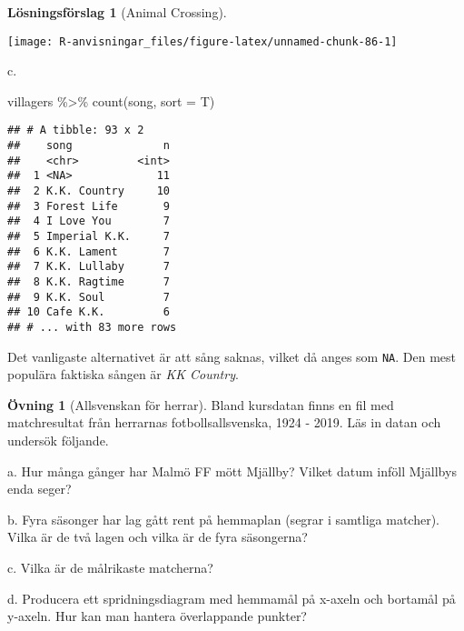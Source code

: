\documentclass[
]{book}
\newenvironment{Shaded}{\begin{snugshade}}{\end{snugshade}}
\newcommand{\AttributeTok}[1]{\textcolor[rgb]{0.77,0.63,0.00}{#1}}
\newcommand{\FunctionTok}[1]{\textcolor[rgb]{0.00,0.00,0.00}{#1}}
\newcommand{\NormalTok}[1]{#1}
\newcommand{\SpecialCharTok}[1]{\textcolor[rgb]{0.00,0.00,0.00}{#1}}
\theoremstyle{definition}
\theoremstyle{definition}
\theoremstyle{definition}
\newtheorem{exercise}{Övning}[chapter]
\theoremstyle{definition}
\newtheorem{hypothesis}{Lösningsförslag}[chapter]
\theoremstyle{remark}
\begin{document}
\begin{hypothesis}[Animal Crossing]
\begin{center}\texttt{[image: R-anvisningar\_files/figure-latex/unnamed-chunk-86-1]} \end{center}

c.

\begin{Shaded}
\begin{Highlighting}[]
\NormalTok{villagers }\SpecialCharTok{\%\textgreater{}\%} 
  \FunctionTok{count}\NormalTok{(song, }\AttributeTok{sort =}\NormalTok{ T)}
\end{Highlighting}
\end{Shaded}

\begin{verbatim}
## # A tibble: 93 x 2
##    song              n
##    <chr>         <int>
##  1 <NA>             11
##  2 K.K. Country     10
##  3 Forest Life       9
##  4 I Love You        7
##  5 Imperial K.K.     7
##  6 K.K. Lament       7
##  7 K.K. Lullaby      7
##  8 K.K. Ragtime      7
##  9 K.K. Soul         7
## 10 Cafe K.K.         6
## # ... with 83 more rows
\end{verbatim}

Det vanligaste alternativet är att sång saknas, vilket då anges som \texttt{NA}. Den mest populära faktiska sången är \emph{KK Country}.
\end{hypothesis}

\begin{exercise}[Allsvenskan för herrar]
Bland kursdatan finns en fil med matchresultat från herrarnas fotbollsallsvenska, 1924 - 2019. Läs in datan och undersök följande.

a. Hur många gånger har Malmö FF mött Mjällby? Vilket datum inföll Mjällbys enda seger?

b. Fyra säsonger har lag gått rent på hemmaplan (segrar i samtliga matcher). Vilka är de två lagen och vilka är de fyra säsongerna?

c. Vilka är de målrikaste matcherna?

d. Producera ett spridningsdiagram med hemmamål på x-axeln och bortamål på y-axeln. Hur kan man hantera överlappande punkter?
\end{exercise}
\end{document}

